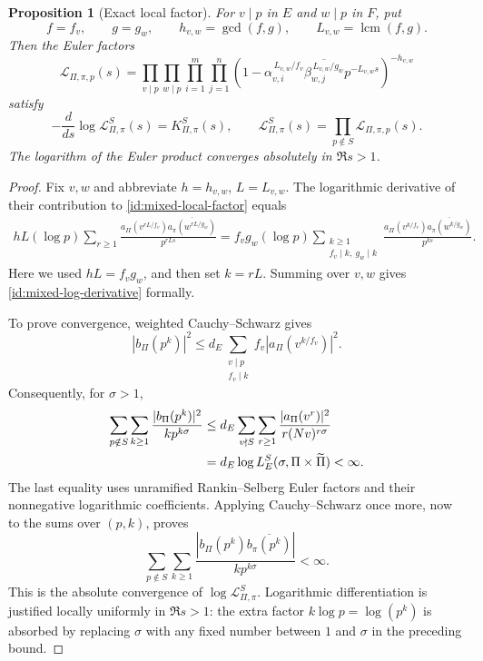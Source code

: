 \documentclass[11pt,reqno]{amsart}
\numberwithin{equation}{section}
\newtheorem{proposition}[theorem]{Proposition}
\theoremstyle{definition}
\theoremstyle{remark}
\begin{document}
\begin{proposition}[Exact local factor]\label{id:local-factor-prop}
For $v\mid p$ in $E$ and $w\mid p$ in $F$, put
\[
 f=f_v,\qquad g=g_w,\qquad h_{v,w}=\gcd(f,g),\qquad
 L_{v,w}=\operatorname{lcm}(f,g).
\]
Then the Euler factors
\begin{equation}\label{id:mixed-local-factor}
 \mathscr L_{\Pi,\pi,p}(s)=
 \prod_{v\mid p}\prod_{w\mid p}
 \prod_{i=1}^{m}\prod_{j=1}^{n}
 \left(1-
 \alpha_{v,i}^{\,L_{v,w}/f_v}
 \overline{\beta_{w,j}^{\,L_{v,w}/g_w}}
 p^{-L_{v,w}s}\right)^{-h_{v,w}}
\end{equation}
satisfy
\begin{equation}\label{id:mixed-log-derivative}
 -\frac{d}{ds}\log\mathscr L_{\Pi,\pi}^S(s)
 =K_{\Pi,\pi}^S(s),\qquad
 \mathscr L_{\Pi,\pi}^S(s)=\prod_{p\notin S}\mathscr L_{\Pi,\pi,p}(s).
\end{equation}
The logarithm of the Euler product converges absolutely in $\Re s>1$.
\end{proposition}

\begin{proof}
Fix $v,w$ and abbreviate $h=h_{v,w}$, $L=L_{v,w}$. The logarithmic
derivative of their contribution to \eqref{id:mixed-local-factor} equals
\begin{align*}
 hL(\log p)\sum_{r\ge1}
 \frac{a_\Pi(v^{rL/f_v})
             \overline{a_\pi(w^{rL/g_w})}}{p^{rLs}}
 =f_vg_w(\log p)\sum_{\substack{k\ge1\\ f_v\mid k,\ g_w\mid k}}
 \frac{a_\Pi(v^{k/f_v})\overline{a_\pi(w^{k/g_w})}}{p^{ks}}.
\end{align*}
Here we used $hL=f_vg_w$, and then set $k=rL$. Summing over $v,w$ gives
\eqref{id:mixed-log-derivative} formally.

To prove convergence, weighted Cauchy--Schwarz gives
\begin{equation}\label{id:diagonal-majorant}
 |b_\Pi(p^k)|^2
 \le d_E\sum_{\substack{v\mid p\\ f_v\mid k}}
           f_v|a_\Pi(v^{k/f_v})|^2.
\end{equation}
Consequently, for $\sigma>1$,
\begin{align}
 \sum_{p\notin S}\sum_{k\ge1}
       \frac{|b_\Pi(p^k)|^2}{kp^{k\sigma}}
 &\le d_E\sum_{v\nmid S}\sum_{r\ge1}
             \frac{|a_\Pi(v^r)|^2}{r(Nv)^{r\sigma}}\notag\\
 &=d_E\log L_E^S(\sigma,\Pi\times\widetilde\Pi)<\infty.
 \label{id:diagonal-convergence}
\end{align}
The last equality uses unramified Rankin--Selberg Euler factors and their
nonnegative logarithmic coefficients. Applying Cauchy--Schwarz once more,
now to the sums over $(p,k)$, proves
\[
 \sum_{p\notin S}\sum_{k\ge1}
 \frac{|b_\Pi(p^k)\overline{b_\pi(p^k)}|}{kp^{k\sigma}}<\infty.
\]
This is the absolute convergence of $\log\mathscr L_{\Pi,\pi}^S$.
Logarithmic differentiation is justified locally uniformly in $\Re s>1$:
the extra factor $k\log p=\log(p^k)$ is absorbed by replacing $\sigma$ with
any fixed number between $1$ and $\sigma$ in the preceding bound.
\end{proof}
\end{document}
